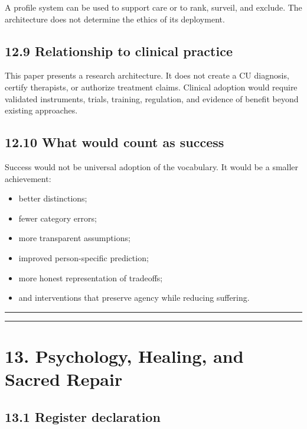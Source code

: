 \documentclass[
  11pt,
]{article}
\providecommand{\tightlist}{%
  \setlength{\itemsep}{0pt}\setlength{\parskip}{0pt}}
\begin{document}
A profile system can be used to support care or to rank, surveil, and
exclude. The architecture does not determine the ethics of its
deployment.

\subsection{12.9 Relationship to clinical
practice}\label{relationship-to-clinical-practice}

This paper presents a research architecture. It does not create a CU
diagnosis, certify therapists, or authorize treatment claims. Clinical
adoption would require validated instruments, trials, training,
regulation, and evidence of benefit beyond existing approaches.

\subsection{12.10 What would count as
success}\label{what-would-count-as-success}

Success would not be universal adoption of the vocabulary. It would be a
smaller achievement:

\begin{itemize}
\tightlist
\item
  better distinctions;
\item
  fewer category errors;
\item
  more transparent assumptions;
\item
  improved person-specific prediction;
\item
  more honest representation of tradeoffs;
\item
  and interventions that preserve agency while reducing suffering.
\end{itemize}

\begin{center}\rule{0.5\linewidth}{0.5pt}\end{center}

\begin{center}\rule{0.5\linewidth}{0.5pt}\end{center}

\section{13. Psychology, Healing, and Sacred
Repair}\label{psychology-healing-and-sacred-repair}

\subsection{13.1 Register declaration}\label{register-declaration}
\end{document}
